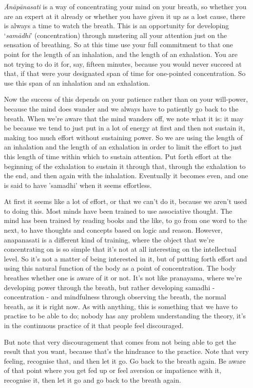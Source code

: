 
\textit{\=An\=ap\=anasati} is a way of concentrating your mind on your breath, so whether you are an expert at it already or whether you have given it up as a lost cause, there is always a time to watch the breath. This is an opportunity for developing `\textit{sam\=adhi}' (concentration) through mustering all your attention just on the sensation of breathing. So at this time use your full commitment to that one point for the length of an inhalation, and the length of an exhalation. You are not trying to do it for, say, fifteen minutes, because you would never succeed at that, if that were your designated span of time for one-pointed concentration. So use this span of an inhalation and an exhalation.

Now the success of this depends on your patience rather than on your will-power, because the mind does wander and we always have to patiently go back to the breath. When we're aware that the mind wanders off, we note what it is: it may be because we tend to just put in a lot of energy at first and then not sustain it, making too much effort without sustaining power. So we are using the length of an inhalation and the length of an exhalation in order to limit the effort to just this length of time within which to sustain attention. Put forth effort at the beginning of the exhalation to sustain it through that, through the exhalation to the end, and then again with the inhalation. Eventually it becomes even, and one is said to have 'samadhi' when it seems effortless.

At first it seems like a lot of effort, or that we can't do it, because we aren't used to doing this. Most minds have been trained to use associative thought. The mind has been trained by reading books and the like, to go from one word to the next, to have thoughts and concepts based on logic and reason. However, anapanasati is a different kind of training, where the object that we're concentrating on is so simple that it's not at all interesting on the intellectual level. So it's not a matter of being interested in it, but of putting forth effort and using this natural function of the body as a point of concentration. The body breathes whether one is aware of it or not. It's not like pranayama, where we're developing power through the breath, but rather developing samadhi - concentration - and mindfulness through observing the breath, the normal breath, as it is right now. As with anything, this is something that we have to practise to be able to do; nobody has any problem understanding the theory, it's in the continuous practice of it that people feel discouraged.

But note that very discouragement that comes from not being able to get the result that you want, because that's the hindrance to the practice. Note that very feeling, recognise that, and then let it go. Go back to the breath again. Be aware of that point where you get fed up or feel aversion or impatience with it, recognise it, then let it go and go back to the breath again.
